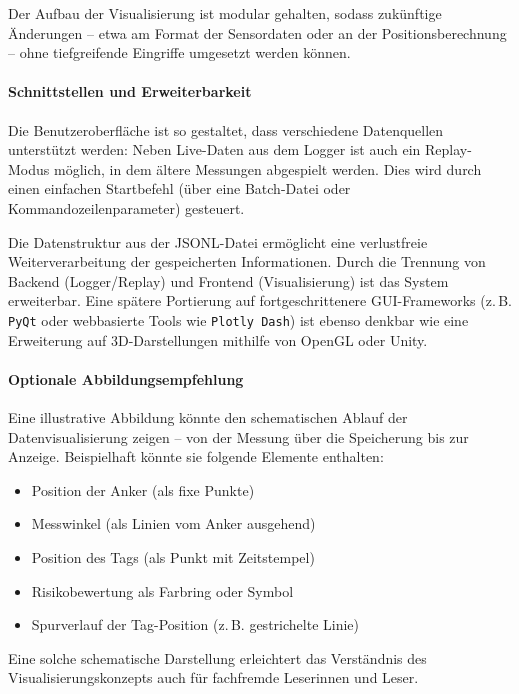 \documentclass[a4paper, 12pt]{article} %
\begin{document}
Der Aufbau der Visualisierung ist modular gehalten, sodass zukünftige Änderungen – etwa am Format der Sensordaten oder an der
Positionsberechnung – ohne tiefgreifende Eingriffe umgesetzt werden können.

\paragraph{Schnittstellen und Erweiterbarkeit}

Die Benutzeroberfläche ist so gestaltet, dass verschiedene Datenquellen unterstützt werden: Neben Live-Daten aus dem Logger ist auch ein 
Replay-Modus möglich, in dem ältere Messungen abgespielt werden. Dies wird durch einen einfachen Startbefehl (über eine Batch-Datei oder
Kommandozeilenparameter) gesteuert.

Die Datenstruktur aus der \ac{JSONL}-Datei ermöglicht eine verlustfreie Weiterverarbeitung der gespeicherten Informationen. Durch die Trennung von 
Backend (Logger/Replay) und Frontend (Visualisierung) ist das System erweiterbar. Eine spätere Portierung auf fortgeschrittenere GUI-Frameworks 
(z.\,B. \texttt{PyQt} oder webbasierte Tools wie \texttt{Plotly Dash}) ist ebenso denkbar wie eine Erweiterung auf 3D-Darstellungen 
mithilfe von OpenGL oder Unity.

\paragraph{Optionale Abbildungsempfehlung}

Eine illustrative Abbildung könnte den schematischen Ablauf der Datenvisualisierung zeigen – von der Messung über die Speicherung bis zur Anzeige. 
Beispielhaft könnte sie folgende Elemente enthalten:

\begin{itemize}
    \item Position der Anker (als fixe Punkte)
    \item Messwinkel (als Linien vom Anker ausgehend)
    \item Position des Tags (als Punkt mit Zeitstempel)
    \item Risikobewertung als Farbring oder Symbol
    \item Spurverlauf der Tag-Position (z.\,B. gestrichelte Linie)
\end{itemize}

Eine solche schematische Darstellung erleichtert das Verständnis des Visualisierungskonzepts auch für fachfremde Leserinnen und Leser.
\end{document}
